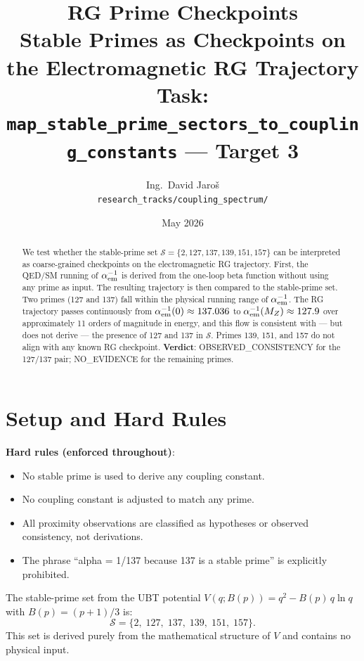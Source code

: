 \documentclass[12pt,a4paper]{article}
\title{\textbf{RG Prime Checkpoints}\\[4pt]
       \large Stable Primes as Checkpoints on the Electromagnetic RG Trajectory\\[2pt]
       \normalsize Task: \texttt{map\_stable\_prime\_sectors\_to\_coupling\_constants} — Target 3}
\author{Ing.\ David Jaro\v{s}\\
  \small \texttt{research\_tracks/coupling\_spectrum/}}
\date{May 2026}
\theoremstyle{definition}
\theoremstyle{remark}
\begin{document}
\maketitle

\begin{abstract}
We test whether the stable-prime set $\mathcal{S} = \{2, 127, 137, 139, 151, 157\}$
can be interpreted as coarse-grained checkpoints on the electromagnetic RG
trajectory.
First, the QED/SM running of $\alpha_{\rm em}^{-1}$ is derived from the
one-loop beta function without using any prime as input.
The resulting trajectory is then compared to the stable-prime set.
Two primes (127 and 137) fall within the physical running range of
$\alpha_{\rm em}^{-1}$.
The RG trajectory passes continuously from $\alpha_{\rm em}^{-1}(0) \approx 137.036$
to $\alpha_{\rm em}^{-1}(M_Z) \approx 127.9$ over approximately 11 orders of
magnitude in energy, and this flow is consistent with — but does not derive —
the presence of 127 and 137 in $\mathcal{S}$.
Primes 139, 151, and 157 do not align with any known RG checkpoint.
\textbf{Verdict}: OBSERVED\_CONSISTENCY for the 127/137 pair;
NO\_EVIDENCE for the remaining primes.
\end{abstract}

\tableofcontents
\clearpage

\section{Setup and Hard Rules}

\begin{warnbox}
\textbf{Hard rules (enforced throughout)}:
\begin{itemize}
\item No stable prime is used to derive any coupling constant.
\item No coupling constant is adjusted to match any prime.
\item All proximity observations are classified as hypotheses or observed consistency,
      not derivations.
\item The phrase ``alpha = 1/137 because 137 is a stable prime'' is explicitly prohibited.
\end{itemize}
\end{warnbox}

The stable-prime set from the UBT potential $V(q; B(p)) = q^2 - B(p)\,q\ln q$
with $B(p) = (p+1)/3$ is:
\[
  \mathcal{S} = \{2,\; 127,\; 137,\; 139,\; 151,\; 157\}.
\]
This set is derived purely from the mathematical structure of $V$ and contains
no physical input.
\end{document}
